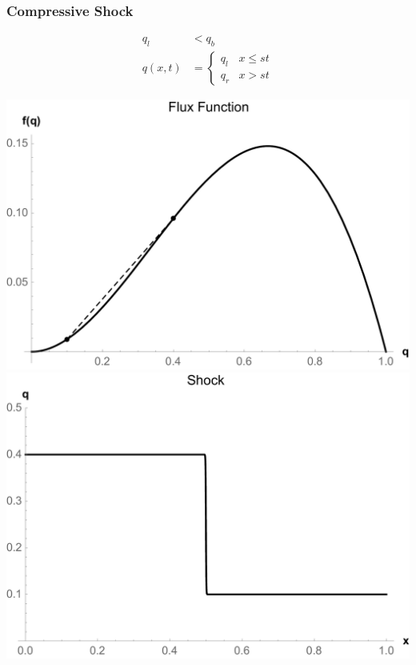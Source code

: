 \documentclass[10pt]{beamer}
\begin{document}
    \begin{frame}
      \frametitle{Compressive Shock}
      \begin{align*}
        q_l &< q_b \\
        q(x, t) &=
        \begin{cases}
          q_l & x \le st \\
          q_r & x > st
        \end{cases}
      \end{align*}
      \begin{center}
        \includegraphics[scale=0.2]{Figures/FluxFunctionCompressiveShock.pdf}
        \includegraphics[scale=0.2]{Figures/CompressiveShock.pdf}
      \end{center}
    \end{frame}
\end{document}
